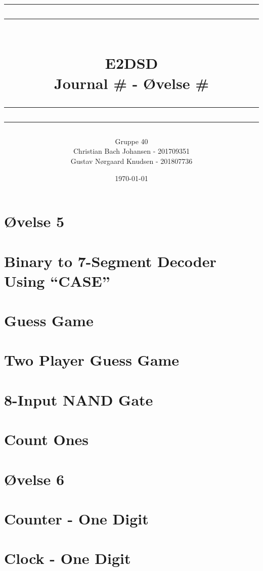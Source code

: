 \documentclass[12pt,a4paper]{article}
\newcommand\mymaketitle[1]{
   \rule{\textwidth}{1.6pt}\vspace*{-\baselineskip}\vspace*{2pt}
   \rule{\textwidth}{0.4pt}
   \\  
   \huge \bf #1\\
   \vspace{-8pt}
   \rule{\textwidth}{0.4pt}\vspace*{-\baselineskip}\vspace{3.2pt}
   \rule{\textwidth}{1.6pt}
}
\begin{document}
\title{
	\mymaketitle{E2DSD\\Journal \# - Øvelse \#}
}
\author{
	Gruppe 40\\
	Christian Bach Johansen - 201709351\\
	Gustav Nørgaard Knudsen - 201807736
}
\date{\today}

\maketitle

\section*{Øvelse 5}

\section{Binary to 7-Segment Decoder Using “CASE”}


\section{Guess Game}


\section{Two Player Guess Game}


\section{8-Input NAND Gate}


\section{Count Ones}


\section*{Øvelse 6}

\section{Counter - One Digit}


\section{Clock - One Digit}

\end{document}
